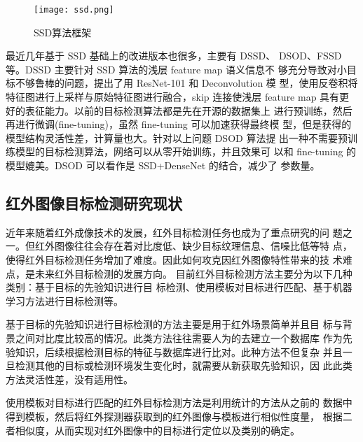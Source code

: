 \begin{figure}[htbp]
    \centering
    \texttt{[image: ssd.png]}
    \caption{SSD算法框架}
    \label{ssd}
\end{figure}

最近几年基于 SSD 基础上的改进版本也很多，主要有 DSSD\cite{fu2017dssd}、
DSOD\cite{shen2017dsod}、FSSD\cite{li2017fssd}等。DSSD 主要针对 SSD 算法的浅层 feature map 语义信息不
够充分导致对小目标不够鲁棒的问题，提出了用 ResNet-101 和 Deconvolution 模
型，使用反卷积将特征图进行上采样与原始特征图进行融合，skip 连接使浅层
feature map 具有更好的表征能力。以前的目标检测算法都是先在开源的数据集上
进行预训练，然后再进行微调(fine-tuning)，虽然 fine-tuning 可以加速获得最终模
型，但是获得的模型结构灵活性差，计算量也大。针对以上问题 DSOD 算法提
出一种不需要预训练模型的目标检测算法，网络可以从零开始训练，并且效果可
以和 fine-tuning 的模型媲美。DSOD 可以看作是 SSD+DenseNet 的结合，减少了
参数量。

\subsection{红外图像目标检测研究现状}
近年来随着红外成像技术的发展，红外目标检测任务也成为了重点研究的问
题之一。但红外图像往往会存在着对比度低、缺少目标纹理信息、信噪比低等特
点，使得红外目标检测任务增加了难度。因此如何攻克因红外图像特性带来的技
术难点，是未来红外目标检测的发展方向。
目前红外目标检测方法主要分为以下几种类别：基于目标的先验知识进行目
标检测、使用模板对目标进行匹配、基于机器学习方法进行目标检测等。

基于目标的先验知识进行目标检测的方法主要是用于红外场景简单并且目
标与背景之间对比度比较高的情况。此类方法往往需要人为的去建立一个数据库
作为先验知识，后续根据检测目标的特征与数据库进行比对。此种方法不但复杂
并且一旦检测其他的目标或检测环境发生变化时，就需要从新获取先验知识，因
此此类方法灵活性差，没有适用性。

使用模板对目标进行匹配的红外目标检测方法是利用统计的方法从之前的
数据中得到模板，然后将红外探测器获取到的红外图像与模板进行相似性度量，
根据二者相似度，从而实现对红外图像中的目标进行定位以及类别的确定\cite{宋曦2010一种基于模板匹配的目标识别方法}。

